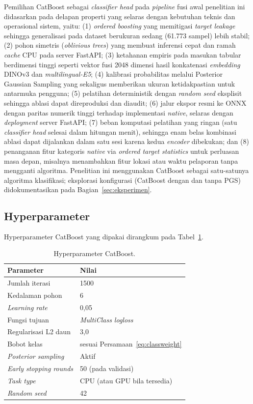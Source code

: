 Pemilihan CatBoost sebagai \textit{classifier head} pada \textit{pipeline} fusi awal penelitian ini didasarkan pada delapan properti yang selaras dengan kebutuhan teknis dan operasional sistem, yaitu: (1) \textit{ordered boosting} \citep{prokhorenkovaCatBoost2018} yang memitigasi \textit{target leakage} sehingga generalisasi pada dataset berukuran sedang (61.773 sampel) lebih stabil; (2) pohon simetris (\textit{oblivious trees}) yang membuat inferensi cepat dan ramah \textit{cache} CPU pada server FastAPI; (3) ketahanan empiris pada masukan tabular berdimensi tinggi seperti vektor fusi 2048 dimensi hasil konkatenasi \textit{embedding} DINOv3 dan \textit{multilingual-E5}; (4) kalibrasi probabilitas melalui Posterior Gaussian Sampling \citep{ustimenkoCatBoostUncertainty2023} yang sekaligus memberikan ukuran ketidakpastian untuk antarmuka pengguna; (5) pelatihan deterministik dengan \textit{random seed} eksplisit sehingga ablasi dapat direproduksi dan diaudit; (6) jalur ekspor resmi ke ONNX dengan paritas numerik tinggi terhadap implementasi \textit{native}, selaras dengan \textit{deployment} server FastAPI; (7) beban komputasi pelatihan yang ringan (satu \textit{classifier head} selesai dalam hitungan menit), sehingga enam belas kombinasi ablasi dapat dijalankan dalam satu sesi karena kedua \textit{encoder} dibekukan; dan (8) penanganan fitur kategoris \textit{native} via \textit{ordered target statistics} untuk perluasan masa depan, misalnya menambahkan fitur lokasi atau waktu pelaporan tanpa mengganti algoritma. Penelitian ini menggunakan CatBoost sebagai satu-satunya algoritma klasifikasi; eksplorasi konfigurasi (CatBoost dengan dan tanpa PGS) didokumentasikan pada Bagian~\ref{sec:eksperimen}.

\subsection{Hyperparameter}

Hyperparameter CatBoost yang dipakai dirangkum pada Tabel~\ref{tab:catboost-hp}.

\begin{table}[htbp]
\centering
\caption{Hyperparameter CatBoost.}
\label{tab:catboost-hp}
\begin{tabular}{p{5.0cm} p{7.0cm}}
\toprule
\textbf{Parameter} & \textbf{Nilai} \\
\midrule
Jumlah iterasi & 1500 \\
Kedalaman pohon & 6 \\
\textit{Learning rate} & 0,05 \\
Fungsi tujuan & \textit{MultiClass logloss} \\
Regularisasi L2 daun & 3,0 \\
Bobot kelas & sesuai Persamaan~\ref{eq:classweight} \\
\textit{Posterior sampling} & Aktif \\
\textit{Early stopping rounds} & 50 (pada validasi) \\
\textit{Task type} & CPU (atau GPU bila tersedia) \\
\textit{Random seed} & 42 \\
\bottomrule
\end{tabular}
\end{table}

